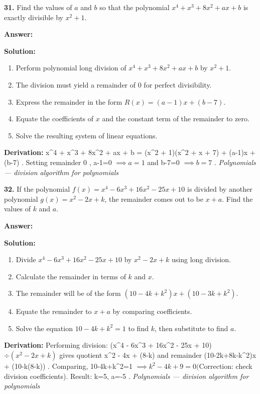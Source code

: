 \documentclass[12pt,a4paper]{exam}
\newcommand{\fitmath}[1]{%
  \sbox{\schmathbox}{$\displaystyle #1$}%
  \ifdim\wd\schmathbox>\linewidth
    \resizebox{\linewidth}{!}{\usebox{\schmathbox}}%
  \else
    \usebox{\schmathbox}%
  \fi}
\begin{document}
\begin{questions}
\question \textbf{31.} Find the values of $a$ and $b$ so that the polynomial $x^4 + x^3 + 8x^2 + ax + b$ is exactly divisible by $x^2 + 1$.

\textbf{Answer:}
\begin{center}
\fitmath{a = 1, b = 7}
\end{center}

\textbf{Solution:}
\begin{enumerate}
  \item Perform polynomial long division of $x^4 + x^3 + 8x^2 + ax + b$ by $x^2 + 1$.
  \item The division must yield a remainder of 0 for perfect divisibility.
  \item Express the remainder in the form $R(x) = (a-1)x + (b-7)$.
  \item Equate the coefficients of $x$ and the constant term of the remainder to zero.
  \item Solve the resulting system of linear equations.
\end{enumerate}
\textbf{Derivation:}
 x\textasciicircum{}4 + x\textasciicircum{}3 + 8x\textasciicircum{}2 + ax + b = (x\textasciicircum{}2 + 1)(x\textasciicircum{}2 + x + 7) + (a-1)x + (b-7) . Setting remainder  0 ,  a-1=0 $\implies a=1$  and  b-7=0 $\implies b=7$ .
\hfill \textit{Polynomials — division algorithm for polynomials}
\vspace{0.3cm}

\question \textbf{32.} If the polynomial $f(x) = x^4 - 6x^3 + 16x^2 - 25x + 10$ is divided by another polynomial $g(x) = x^2 - 2x + k$, the remainder comes out to be $x + a$. Find the values of $k$ and $a$.

\textbf{Answer:}
\begin{center}
\fitmath{k = 5, a = -5}
\end{center}

\textbf{Solution:}
\begin{enumerate}
  \item Divide $x^4 - 6x^3 + 16x^2 - 25x + 10$ by $x^2 - 2x + k$ using long division.
  \item Calculate the remainder in terms of $k$ and $x$.
  \item The remainder will be of the form $(10 - 4k + k^2)x + (10 - 3k + k^2)$.
  \item Equate the remainder to $x + a$ by comparing coefficients.
  \item Solve the equation $10 - 4k + k^2 = 1$ to find $k$, then substitute to find $a$.
\end{enumerate}
\textbf{Derivation:}
Performing division:  (x\textasciicircum{}4 - 6x\textasciicircum{}3 + 16x\textasciicircum{}2 - 25x + 10) $\div (x^2 - 2x + k)$  gives quotient  x\textasciicircum{}2 - 4x + (8-k)  and remainder  (10-2k+8k-k\textasciicircum{}2)x + (10-k(8-k)) . Comparing,  10-4k+k\textasciicircum{}2=1 $\implies k^2-4k+9=0  ($Correction: check division coefficients). Result:  k=5, a=-5 .
\hfill \textit{Polynomials — division algorithm for polynomials}
\vspace{0.3cm}


\end{questions}
\end{document}
